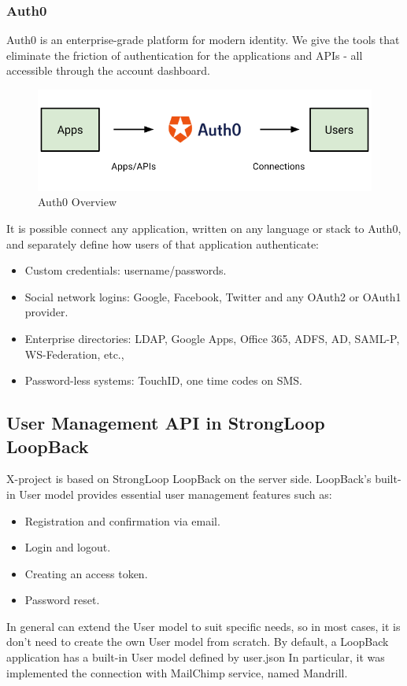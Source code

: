 \subsubsection{Auth0}

Auth0 is an enterprise-grade platform for modern identity.
We give the tools that eliminate the friction of authentication for the applications and APIs - all accessible through the account dashboard.\cite{usr_auth0}

\begin {figure}[h]
\graphicspath{{images/chapter_USR/}}
\includegraphics[width=\textwidth]{auth0}
\caption{Auth0 Overview}
\end {figure}

It is possible connect any application, written on any language or stack to Auth0, and separately define how users of that application authenticate:

\begin{itemize}
\item Custom credentials: username/passwords.
\item Social network logins: Google, Facebook, Twitter and any OAuth2 or OAuth1 provider.
\item Enterprise directories: LDAP, Google Apps, Office 365, ADFS, AD, SAML-P, WS-Federation, etc.,
\item Password-less systems: TouchID, one time codes on SMS.
\end{itemize}


\subsection{User Management API in StrongLoop LoopBack}

X-project is based on StrongLoop LoopBack on the server side.
LoopBack's built-in User model provides essential user management features such as:
\begin{itemize}
\item Registration and confirmation via email.
\item Login and logout.
\item Creating an access token.
\item Password reset. 
\end{itemize}
In general can extend the User model to suit specific needs, so in most cases, it is don't need to create the own User model from scratch.
By default, a LoopBack application has a built-in User model defined by user.json
In particular, it was implemented the connection with MailChimp service, named Mandrill.
